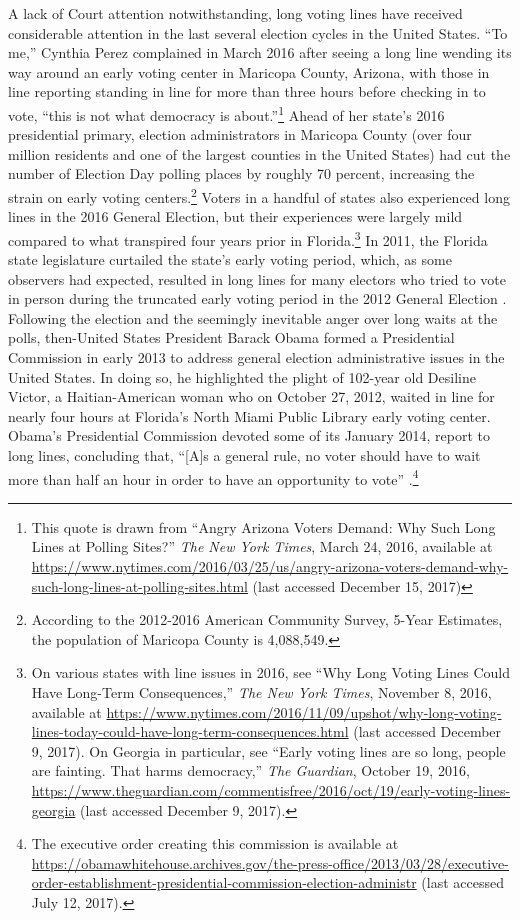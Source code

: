 \documentclass[12pt,titlepage]{article}
\begin{document}
A lack of Court attention notwithstanding, long voting lines have
received considerable attention in the last several election cycles in
the United States.  ``To me,'' Cynthia Perez complained in March 2016
after seeing a long line wending its way around an early voting center
in Maricopa County, Arizona, with those in line reporting standing in
line for more than three hours before checking in to vote, ``this is
not what democracy is about.''\footnote{This quote is drawn from
  ``Angry Arizona Voters Demand: Why Such Long Lines at Polling
  Sites?'' \emph{The New York Times}, March 24, 2016, available at
  \url{https://www.nytimes.com/2016/03/25/us/angry-arizona-voters-demand-why-such-long-lines-at-polling-sites.html}
  (last accessed December 15, 2017)} Ahead of her state's 2016
presidential primary, election administrators in Maricopa County (over
four million residents and one of the largest counties in the United
States) had cut the number of Election Day polling places by roughly
70 percent, increasing the strain on early voting
centers.\footnote{According to the 2012-2016 American Community
  Survey, 5-Year Estimates, the population of Maricopa County is
  4,088,549.}  Voters in a handful of states also experienced long
lines in the 2016 General Election, but their experiences were largely
mild compared to what transpired four years prior in
Florida.\footnote{On various states with line issues in 2016, see
  ``Why Long Voting Lines Could Have Long-Term Consequences,''
  \emph{The New York Times}, November 8, 2016, available at
  \url{https://www.nytimes.com/2016/11/09/upshot/why-long-voting-lines-today-could-have-long-term-consequences.html}
  (last accessed December 9, 2017).  On Georgia in particular, see
  ``Early voting lines are so long, people are fainting. That harms
  democracy,'' \emph{The Guardian}, October 19, 2016,
  \url{https://www.theguardian.com/commentisfree/2016/oct/19/early-voting-lines-georgia}
  (last accessed December 9, 2017).}  In 2011, the Florida state
legislature curtailed the state's early voting period, which, as some
observers had expected, resulted in long lines for many electors who
tried to vote in person during the truncated early voting period in
the 2012 General Election \citep{herron_smith2014}.  Following the
election and the seemingly inevitable anger over long waits at the
polls, then-United States President Barack Obama formed a Presidential
Commission in early 2013 to address general election administrative
issues in the United States.  In doing so, he highlighted the plight
of 102-year old Desiline Victor, a Haitian-American woman who on
October 27, 2012, waited in line for nearly four hours at Florida's
North Miami Public Library early voting center.  Obama's Presidential
Commission devoted some of its January 2014, report to long lines,
concluding that, ``[A]s a general rule, no voter should have to wait
more than half an hour in order to have an opportunity to vote''
\citep[p.\ 13,][]{pcea:2014}.\footnote{The executive order creating
  this commission is available at
  \url{https://obamawhitehouse.archives.gov/the-press-office/2013/03/28/executive-order-establishment-presidential-commission-election-administr}
  (last accessed July 12, 2017).}
\end{document}

